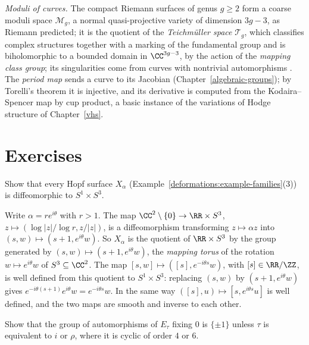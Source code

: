 \begin{remark}\label{deformations:remark-moduli-curves}
\emph{Moduli of curves.} The compact Riemann surfaces of genus $g \geq 2$ form a coarse moduli space $\mathcal{M}_g$, a normal quasi-projective variety of dimension $3g - 3$, as Riemann predicted; it is
the quotient of the \emph{Teichm\"uller space} $\mathcal{T}_g$, which classifies complex structures together with a marking of the fundamental group and is biholomorphic to a bounded domain in $\CC^{3g - 3}$,
by the action of the \emph{mapping class group}; its singularities come from curves with nontrivial automorphisms \cite{harris-morrison}. The \emph{period map} sends a curve to its Jacobian
(Chapter~\ref{algebraic-groups}); by Torelli's theorem it is injective, and its derivative is computed from the Kodaira--Spencer map by cup product, a basic instance of the variations of Hodge structure
of Chapter~\ref{vhs}.
\end{remark}

\section{Exercises}\label{deformations:section-exercises}

\begin{exercise}\label{deformations:exercise-hopf}
Show that every Hopf surface $X_\alpha$ (Example~\ref{deformations:example-families}(3)) is diffeomorphic to $S^1 \times S^3$.
\end{exercise}

\begin{solution}
Write $\alpha = re^{i\theta}$ with $r > 1$. The map $\CC^2 \setminus \{0\} \to \RR \times S^3$, $z \mapsto (\log|z|/\log r, z/|z|)$, is a diffeomorphism transforming $z \mapsto \alpha z$ into
$(s, w) \mapsto (s + 1, e^{i\theta}w)$. So $X_\alpha$ is the quotient of $\RR \times S^3$ by the group generated by $(s, w) \mapsto (s + 1, e^{i\theta}w)$, the \emph{mapping torus} of the rotation $w \mapsto e^{i\theta}w$ of $S^3 \subseteq \CC^2$.
The map $[s, w] \mapsto ([s], e^{-i\theta s}w)$, with $[s] \in \RR/\ZZ$, is well defined from this quotient to $S^1 \times S^3$: replacing $(s, w)$ by $(s + 1, e^{i\theta}w)$ gives
$e^{-i\theta(s + 1)}e^{i\theta}w = e^{-i\theta s}w$. In the same way $([s], u) \mapsto [s, e^{i\theta s}u]$ is well defined, and the two maps are smooth and inverse to each other.
\end{solution}

\begin{exercise}\label{deformations:exercise-automorphisms-elliptic}
Show that the group of automorphisms of $E_\tau$ fixing $0$ is $\{\pm1\}$ unless $\tau$ is equivalent to $i$ or $\rho$, where it is cyclic of order $4$ or $6$.
\end{exercise}

